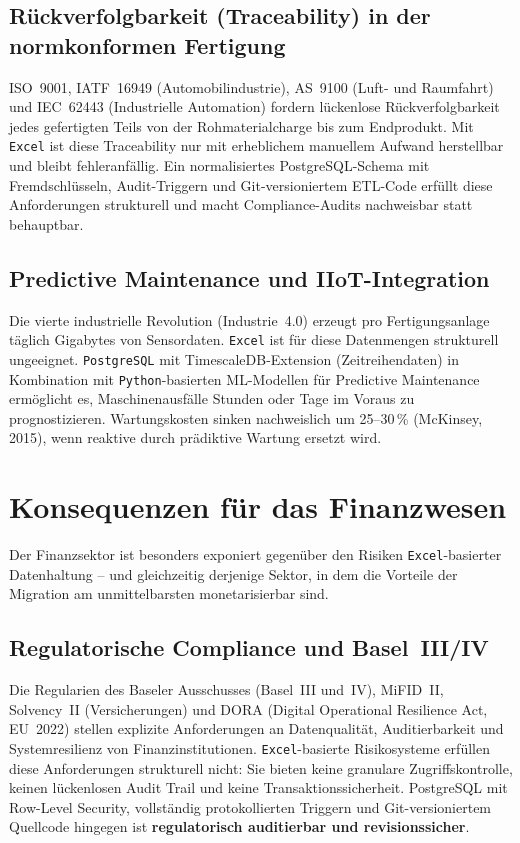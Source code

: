 \documentclass[12pt,a4paper]{report}
\theoremstyle{definition}
\theoremstyle{remark}
\newcommand{\excel}{\texttt{Excel}}
\newcommand{\pg}{\texttt{PostgreSQL}}
\newcommand{\py}{\texttt{Python}}
\begin{document}
\subsection{Rückverfolgbarkeit (Traceability) in der normkonformen Fertigung}

ISO~9001, IATF~16949 (Automobilindustrie), AS~9100 (Luft- und
Raumfahrt) und IEC~62443 (Industrielle Automation) fordern
lückenlose Rückverfolgbarkeit jedes gefertigten Teils von der
Rohmaterialcharge bis zum Endprodukt.
Mit \excel{} ist diese Traceability nur mit erheblichem manuellem
Aufwand herstellbar und bleibt fehleranfällig.
Ein normalisiertes PostgreSQL-Schema mit Fremdschlüsseln,
Audit-Triggern und Git-versioniertem ETL-Code erfüllt diese
Anforderungen strukturell und macht Compliance-Audits nachweisbar
statt behauptbar.

\subsection{Predictive Maintenance und IIoT-Integration}

Die vierte industrielle Revolution (Industrie~4.0) erzeugt pro
Fertigungsanlage täglich Gigabytes von Sensordaten.
\excel{} ist für diese Datenmengen strukturell ungeeignet.
\pg{} mit TimescaleDB-Extension (Zeitreihendaten) in Kombination
mit \py-basierten ML-Modellen für Predictive Maintenance ermöglicht
es, Maschinenausfälle Stunden oder Tage im Voraus zu prognostizieren.
Wartungskosten sinken nachweislich um 25--30\,\% (McKinsey, 2015),
wenn reaktive durch prädiktive Wartung ersetzt wird.

\section{Konsequenzen für das Finanzwesen}

Der Finanzsektor ist besonders exponiert gegenüber den Risiken
\excel-basierter Datenhaltung -- und gleichzeitig derjenige Sektor,
in dem die Vorteile der Migration am unmittelbarsten monetarisierbar
sind.

\subsection{Regulatorische Compliance und Basel~III/IV}

Die Regularien des Baseler Ausschusses (Basel~III und~IV),
MiFID~II, Solvency~II (Versicherungen) und DORA
(Digital Operational Resilience Act, EU~2022) stellen explizite
Anforderungen an Datenqualität, Auditierbarkeit und Systemresilienz
von Finanzinstitutionen.
\excel-basierte Risikosysteme erfüllen diese Anforderungen strukturell
nicht: Sie bieten keine granulare Zugriffskontrolle, keinen
lückenlosen Audit Trail und keine Transaktionssicherheit.
PostgreSQL mit Row-Level Security, vollständig protokollierten
Triggern und Git-versioniertem Quellcode hingegen ist
\textbf{regulatorisch auditierbar und revisionssicher}.
\end{document}
